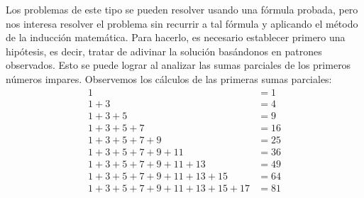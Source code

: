 \solucion Los problemas de este tipo se pueden resolver usando una fórmula probada, pero nos interesa resolver el problema sin recurrir a tal fórmula y aplicando el método de la inducción matemática. Para hacerlo, es necesario establecer primero una hipótesis, es decir, tratar de adivinar la solución basándonos en patrones observados. Esto se puede lograr al analizar las sumas parciales de los primeros números impares. Observemos los cálculos de las primeras sumas parciales:
\begin{align*}
    1 & = 1 \\
    1 + 3 & = 4 \\
    1 + 3 + 5 & = 9 \\
    1 + 3 + 5 + 7 & = 16 \\
    1 + 3 + 5 + 7 + 9 & = 25 \\
    1 + 3 + 5 + 7 + 9 + 11 & = 36 \\
    1 + 3 + 5 + 7 + 9 + 11 + 13 & = 49 \\
    1 + 3 + 5 + 7 + 9 + 11 + 13 + 15 & = 64 \\
    1 + 3 + 5 + 7 + 9 + 11 + 13 + 15 + 17 & = 81
\end{align*}\newpage
